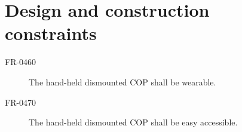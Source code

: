  \section{Design and construction constraints}
 \begin{description}
 \item[FR-0460] The hand-held dismounted COP shall be wearable.
 \item[FR-0470] The hand-held dismounted COP shall be easy accessible.
 \end{description}